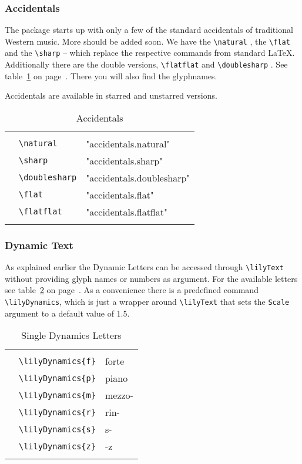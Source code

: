 \documentclass{article}
\newcommand*{\cmd}[1]{\texttt{\textbackslash #1}}
\newcommand{\tmpCaption}{} %
\newcommand{\tmpLabel}{}
\newenvironment{reftable}[2]
	{%
		\renewcommand{\tmpCaption}{#1}
		\renewcommand{\tmpLabel}{#2}
		\begin{table}[ht]
		\begin{center}
		\begin{tabular}[t]{lll}
		\hline
		&\\
	}
	{%
		&\\
		\hline
		\end{tabular}
		\caption{\tmpCaption}
		\label{table:\tmpLabel}
		\end{center}
		\end{table}
	}
\begin{document}
\subsubsection{Accidentals}
The package starts up with only a few of the standard accidentals of traditional Western music. More should be added soon. We have the \cmd{natural} \natural, the \cmd{flat} \flat* and the \cmd{sharp} \sharp* -- which replace the respective commands from standard \LaTeX. Additionally there are the double versions, \cmd{flatflat} \flatflat* and \cmd{doublesharp} \doublesharp. See table~\ref{table:accidentals} on page~\pageref{table:accidentals}. There you will also find the glyphnames.

Accidentals are available in starred and unstarred versions.

\begin{reftable}{Accidentals}{accidentals}
\natural & \cmd{natural} & "accidentals.natural"\\
\sharp & \cmd{sharp} & "accidentals.sharp"\\
\doublesharp & \cmd{doublesharp} & "accidentals.doublesharp"\\
\flat & \cmd{flat} & "accidentals.flat"\\
\flatflat & \cmd{flatflat} & "accidentals.flatflat"\\
\end{reftable}



\subsubsection{Dynamic Text}
As explained earlier the Dynamic Letters can be accessed through \cmd{lilyText} without providing glyph names or numbers as argument. For the available letters see table~\ref{table:singleDynLetters} on page~\pageref{table:singleDynLetters}. As a convenience there is a predefined command \cmd{lilyDynamics}, which is just a wrapper around \cmd{lilyText} that sets the \texttt{Scale} argument to a default value of 1.5.

\begin{reftable}{Single Dynamics Letters}{singleDynLetters}
\lilyDynamics{f} & \cmd{lilyDynamics\{f\}} & forte\\
\lilyDynamics{p} & \cmd{lilyDynamics\{p\}} & piano\\
\lilyDynamics{m} & \cmd{lilyDynamics\{m\}} & mezzo-\\
\lilyDynamics{r} & \cmd{lilyDynamics\{r\}} & rin-\\
\lilyDynamics{s} & \cmd{lilyDynamics\{s\}} & s-\\
\lilyDynamics{z} & \cmd{lilyDynamics\{z\}} & -z\\
\end{reftable}
\end{document}
